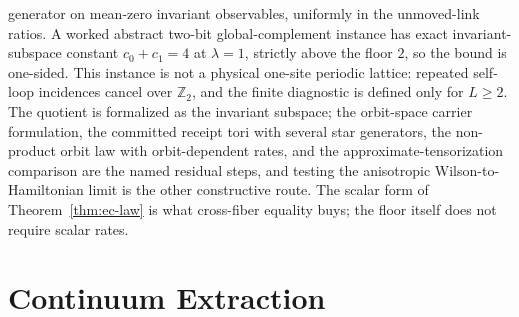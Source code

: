 \documentclass[11pt]{article}
\numberwithin{equation}{section}
\theoremstyle{remark}
\begin{document}
generator on mean-zero invariant observables, uniformly in the
unmoved-link ratios. A worked abstract two-bit global-complement instance
has exact invariant-subspace constant \(c_0+c_1=4\) at \(\lambda=1\),
strictly above the floor \(2\), so the bound is one-sided. This instance is
not a physical one-site periodic lattice: repeated self-loop incidences
cancel over \(\mathbb Z_2\), and the finite diagnostic is defined only for
\(L\ge2\).
The quotient is formalized as the invariant
subspace; the orbit-space carrier formulation, the committed receipt tori
with several star generators, the non-product orbit law with
orbit-dependent rates, and the approximate-tensorization comparison are
the named residual steps, and testing the anisotropic
Wilson-to-Hamiltonian limit is the other constructive route. The
scalar form of
Theorem~\ref{thm:ec-law} is what cross-fiber equality buys; the floor itself
does not require scalar rates.

\section{Continuum Extraction}
\label{sec:continuum-extraction}
\end{document}

